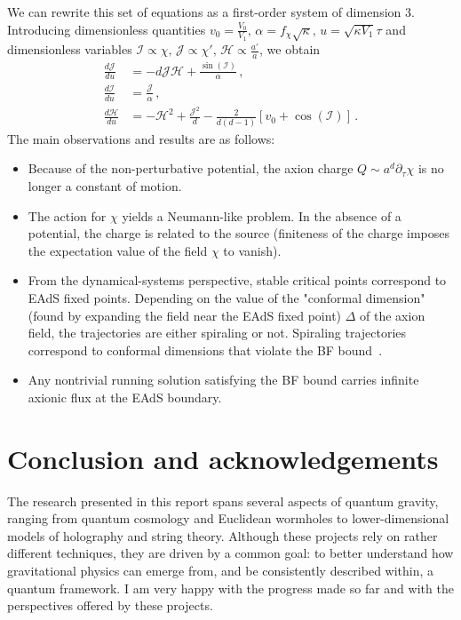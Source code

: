 \documentclass[a4paper]{article}
\begin{document}
We can rewrite this set of equations as a first-order system of dimension 3. Introducing dimensionless quantities $v_0 = \frac{V_0}{V_1},\, \alpha = f_\chi \sqrt{\kappa},\, u = \sqrt{\kappa V_1}\tau$ and dimensionless variables $\mathcal{I}\propto \chi,\,\mathcal{J}\propto \chi',\,\mathcal{H}\propto \frac{a'}{a}$, we obtain
\begin{equation}
\begin{aligned}
    \frac{d\mathcal{J}}{du}&=-d\mathcal{J}\mathcal{H}+\frac{\sin(\mathcal{I})}{\alpha}\,,\\
    \frac{d\mathcal{I}}{du} &=\frac{\mathcal{J}}{\alpha}\,,\\
    \frac{d\mathcal{H}}{du}&=-\mathcal{H}^2+\frac{\mathcal{J}^2}{d}-\frac{2}{d(d-1)}\left[v_0+\cos(\mathcal{I})\right]\,.
\end{aligned}
\end{equation}
The main observations and results are as follows:
\begin{itemize}
  \item Because of the non-perturbative potential, the axion charge $Q\sim a^d \partial_\tau \chi$ is no longer a constant of motion.
  \item The action for $\chi$ yields a Neumann-like problem. In the absence of a potential, the charge is related to the source (finiteness of the charge imposes the expectation value of the field $\chi$ to vanish). 
  \item From the dynamical-systems perspective, stable critical points correspond to EAdS fixed points. Depending on the value of the "conformal dimension" (found by expanding the field near the EAdS fixed point) $\Delta$ of the axion field, the trajectories are either spiraling or not. Spiraling trajectories correspond to conformal dimensions that violate the BF bound~\cite{Breitenlohner:1982bm,Breitenlohner:1982jf}.
  \item Any nontrivial running solution satisfying the BF bound carries infinite axionic flux at the EAdS boundary.
\end{itemize}

\section{Conclusion and acknowledgements}

The research presented in this report spans several aspects of quantum gravity, ranging from quantum cosmology and Euclidean wormholes to lower-dimensional models of holography and string theory. Although these projects rely on rather different techniques, they are driven by a common goal: to better understand how gravitational physics can emerge from, and be consistently described within, a quantum framework. I am very happy with the progress made so far and with the perspectives offered by these projects.
\end{document}
